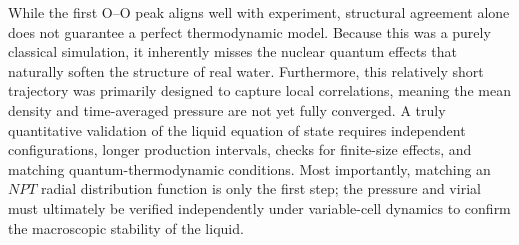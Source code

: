 \documentclass[aps,prx,preprint,notitlepage,superscriptaddress,nofootinbib,floatfix]{revtex4-2}
\begin{document}
While the first O--O peak aligns well with experiment, structural agreement alone does not guarantee a perfect thermodynamic model. Because this was a purely classical simulation, it inherently misses the nuclear quantum effects that naturally soften the structure of real water. Furthermore, this relatively short trajectory was primarily designed to capture local correlations, meaning the mean density and time-averaged pressure are not yet fully converged. A truly quantitative validation of the liquid equation of state requires independent configurations, longer production intervals, checks for finite-size effects, and matching quantum-thermodynamic conditions. Most importantly, matching an $NPT$ radial distribution function is only the first step; the pressure and virial must ultimately be verified independently under variable-cell dynamics to confirm the macroscopic stability of the liquid.



\end{document}
